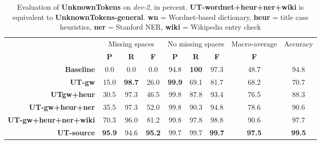 \documentclass[a4paper,10pt]{scrartcl}
\theoremstyle{style}
\begin{document}
\begin{table}
\begin{center}
\begin{tabular}{r|c|c|c|c|c|c|c|c|}
& \multicolumn{3}{c|}{Missing spaces} & \multicolumn{3}{c|}{No missing spaces} & Macro-average & Accuracy\\
& \textbf{P} & \textbf{R} & \textbf{F} & \textbf{P} & \textbf{R} & \textbf{F} & \textbf{F} & \\
\hline
\textbf{Baseline} & 0.0 & 0.0 & 0.0 & 94.8 & \textbf{100} & 97.3 & 48.7 & 94.8\\
\hline
\textbf{UT-gw} & 15.0 & \textbf{98.7} & 26.0 & \textbf{99.9} & 69.1 & 81.7 & 68.2 & 70.7\\
\hline
\textbf{UTgw+heur} & 30.5 & 97.3 & 46.5 & 99.8 & 87.8 & 93.4 & 76.5 & 88.3\\
\hline
\textbf{UT-gw+heur+ner} & 35.5 & 97.3 & 52.0 & 99.8 & 90.3 & 94.8 & 78.6 & 90.6\\
\hline
\textbf{UT-gw+heur+ner+wiki} & 70.3 & 96.0 & 81.2 & 99.8 & 97.8 & 98.8 & 90.6 & 97.7\\
\hline
\textbf{UT-source} & \textbf{95.9} & 94.6 & \textbf{95.2} & 99.7 & 99.7 & \textbf{99.7} & \textbf{97.5} & \textbf{99.5}\\
\end{tabular}
\end{center}
\caption{Evaluation of \textbf{UnknownTokens} on \textit{dev-2}, in percent. \textbf{UT-wordnet+heur+ner+wiki} is equivalent to \textbf{UnknownTokens-general}. \textbf{wn} = Wordnet-based dictionary, \textbf{heur} = title case heuristics, \textbf{ner} = Stanford NER, \textbf{wiki} = Wikipedia entry check}
\label{eval_unknowntokens}
\end{table}
\end{document}
